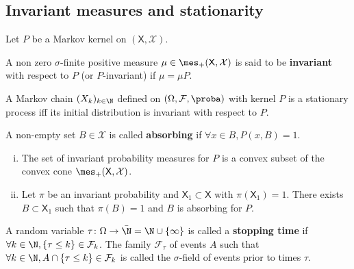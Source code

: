 \subsection{Invariant measures and stationarity}

	Let $P$ be a Markov kernel on $(\mathsf{X},\mathcal{X})$.

	\begin{defn}
		A non zero $\sigma$-finite positive measure $\mu \in \mes_+(\mathsf{X},\mathcal{X})$ is said to be \textbf{invariant} with respect to $P$ (or $P$-invariant) if $\mu = \mu P$.
	\end{defn}

	\begin{thm}
		A Markov chain $(X_k)_{k \in \N}$ defined on $(\Omega,\mathcal{F},\proba)$ with kernel $P$ is a stationary process iff its initial distribution is invariant with respect to $P$.
	\end{thm}

	\begin{defn}
		A non-empty set $B \in \mathcal{X}$ is called \textbf{absorbing} if $\forall x \in B, P(x,B) = 1$.
	\end{defn}

	\begin{thm}
		\begin{enumerate}[(i)]
			\item The set of invariant probability measures for $P$ is a convex subset of the convex cone $\mes_+(\mathsf{X},\mathcal{X})$.
			\item Let $\pi$ be an invariant probability and $\mathsf{X}_1 \subset \mathsf{X}$ with $\pi(\mathsf{X}_1) = 1$.
				There exists $B \subset \mathsf{X}_1$ such that $\pi(B) = 1$ and $B$ is absorbing for $P$.
		\end{enumerate}
	\end{thm}

	\begin{defn}
		A random variable $\tau \colon \Omega \to \Bar{\N} = \N \cup \{ \infty \}$ is called a \textbf{stopping time} if $\forall k \in \N, \{ \tau \leq k \} \in \mathcal{F}_k$.
		The family $\mathcal{F}_\tau$ of events $A$ such that $\forall k \in \N, A \cap \{ \tau \leq k \} \in \mathcal{F}_k$ is called the $\sigma$-field of events prior to times $\tau$.
	\end{defn}
